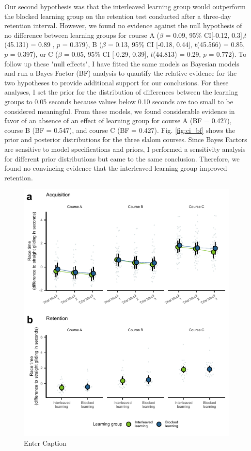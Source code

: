 Our second hypothesis was that the interleaved learning group would outperform the blocked learning group on the retention test conducted after a three-day retention interval. However, we found no evidence against the null hypothesis of no difference between learning groups for course A ($\beta$ = 0.09, 95\% CI[-0.12, 0.3],$t$(45.131) = 0.89 , $p$ = 0.379), B ($\beta$ = 0.13, 95\% CI [-0.18, 0.44], $t$(45.566) = 0.85, $p$ = 0.397), or C ($\beta$ = 0.05, 95\% CI [-0.29, 0.39], $t$(44.813) = 0.29, $p$ = 0.772). To follow up these "null effects", I have fitted the same models as Bayesian models and run a Bayes Factor (BF) analysis to quantify the relative evidence for the two hypotheses to provide additional support for our conclusions. For these analyses, I set the prior for the distribution of differences between the learning groups to 0.05 seconds because values below 0.10 seconds are too small to be considered meaningful. From these models, we found considerable evidence in favor of an absence of an effect of learning group for course A  (BF = 0.427), course B (BF = 0.547), and course C (BF = 0.427). Fig. \ref{fig:ci_bf} shows the prior and posterior distributions for the three slalom courses. Since Bayes Factors are sensitive to model specifications and priors, I performed a sensitivity analysis for different prior distributions but came to the same conclusion. Therefore, we found no convincing evidence that the interleaved learning group improved retention.

\begin{figure}
    \centering
    \includegraphics[width=1\linewidth]{figure/figure_results_ci_acquisitionandretention.pdf}
    \caption{Enter Caption}
    \label{fig:ci_results}
\end{figure}

